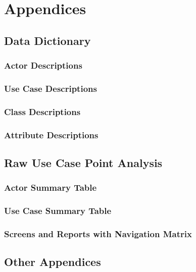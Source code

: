 \section{Appendices}
  \subsection{Data Dictionary}
    \subsubsection{Actor Descriptions}
    \subsubsection{Use Case Descriptions}
    \subsubsection{Class Descriptions}
    \subsubsection{Attribute Descriptions}
  \subsection{Raw Use Case Point Analysis}
    \subsubsection{Actor Summary Table}
    \subsubsection{Use Case Summary Table}
    \subsubsection{Screens and Reports with Navigation Matrix}
  \subsection{Other Appendices}
